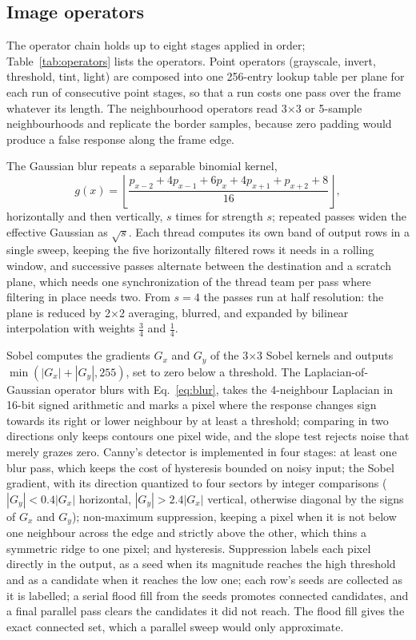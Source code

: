 \subsection{Image operators}\label{sec:operators}

The operator chain holds up to eight stages applied in order;
Table~\ref{tab:operators}
lists the operators. Point operators (grayscale, invert, threshold, tint, light)
are composed into one 256-entry lookup table per plane for each run
of consecutive
point stages, so that a run costs one pass over the frame whatever
its length. The
neighbourhood operators read 3$\times$3 or 5-sample neighbourhoods
and replicate the
border samples, because zero padding would produce a false response
along the frame
edge.

The Gaussian blur repeats a separable binomial kernel,
\begin{equation}\label{eq:blur}
  g(x) = \left\lfloor \frac{p_{x-2} + 4p_{x-1} + 6p_x + 4p_{x+1} +
  p_{x+2} + 8}{16}
  \right\rfloor ,
\end{equation}
horizontally and then vertically, $s$ times for strength $s$;
repeated passes widen
the effective Gaussian as $\sqrt{s}$. Each thread computes its own
band of output rows
in a single sweep, keeping the five horizontally filtered rows it
needs in a rolling
window, and successive passes alternate between the destination and a
scratch plane,
which needs one synchronization of the thread team per pass where
filtering in place
needs two. From $s = 4$ the passes run at half resolution: the plane
is reduced by
2$\times$2 averaging, blurred, and expanded by bilinear interpolation
with weights
$\tfrac34$ and $\tfrac14$.

Sobel \cite{duda1973} computes the gradients $G_x$ and $G_y$ of the
3$\times$3 Sobel
kernels and outputs $\min(|G_x| + |G_y|, 255)$, set to zero below a threshold.
The Laplacian-of-Gaussian operator \cite{marr1980} blurs with
Eq.~\eqref{eq:blur}, takes the 4-neighbour Laplacian in 16-bit signed
arithmetic and
marks a pixel where the response changes sign towards its right or
lower neighbour by
at least a threshold; comparing in two directions only keeps contours
one pixel wide,
and the slope test rejects noise that merely grazes zero. Canny's detector
\cite{canny1986} is implemented in four stages: at least one blur
pass, which keeps
the cost of hysteresis bounded on noisy input; the Sobel gradient,
with its direction
quantized to four sectors by integer comparisons ($|G_y| < 0.4|G_x|$ horizontal,
  $|G_y| > 2.4|G_x|$ vertical, otherwise diagonal by the signs of $G_x$
and $G_y$);
non-maximum suppression, keeping a pixel when it is not below one
neighbour across the
edge and strictly above the other, which thins a symmetric ridge to
one pixel; and
hysteresis. Suppression labels each pixel directly in the output, as
a seed when its
magnitude reaches the high threshold and as a candidate when it
reaches the low one;
each row's seeds are collected as it is labelled; a serial flood fill
from the seeds
promotes connected candidates, and a final parallel pass clears the
candidates it did
not reach. The flood fill gives the exact connected set, which a
parallel sweep would
only approximate.

